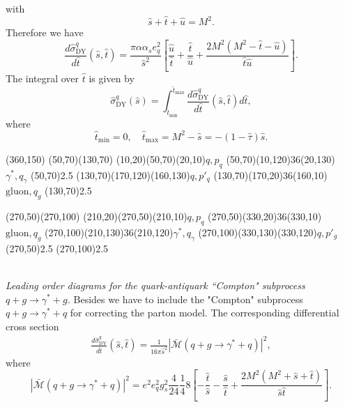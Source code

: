 with 
\begin{equation}
\hat{s}+\hat{t}+\hat{u}=M^2.
\end{equation}
Therefore we have 
\begin{equation}
\frac{d\hat{\sigma}^q_\text{DY}}{d\hat{t}}(\hat{s},\hat{t})=\frac{\pi\alpha\alpha_s e^2_q}{\hat{s}^2}\left[ \frac{\hat{u}}{\hat{t}}+\frac{\hat{t}}{\hat{u}}+\frac{2M^2(M^2-\hat{t}-\hat{u})}{\hat{t}\hat{u}} \right].
\end{equation}
The integral over $\hat{t}$ is given by
\begin{equation}
\hat{\sigma}^q_\text{DY}(\hat{s})=\int_{\hat{t}_\text{min}}^{\hat{t}_\text{max}}\frac{d\hat{\sigma}^q_\text{DY}}{d\hat{t}}(\hat{s},\hat{t})d\hat{t},
\end{equation}
where 
\begin{equation}
\hat{t}_\text{min}=0,\quad \hat{t}_\text{max}=M^2-\hat{s}=-(1-\hat{\tau})\hat{s}.
\end{equation}
\newline\newline
\begin{axopicture}(360,150) 
	\Line[arrow](50,70)(130,70)
	\Line[arrow](10,20)(50,70)\Text(20,10){$q,p_q$}
	\Photon(50,70)(10,120){3}{6}\Text(20,130){$\gamma^\ast,q_\gamma$}
	\Vertex(50,70){2.5}
	\Line[arrow](130,70)(170,120)\Text(160,130){$q,p'_q$}
	\Gluon(130,70)(170,20){3}{6}\Text(160,10){$\text{gluon},q_g$}
	\Vertex(130,70){2.5}
	
	\Line[arrow](270,50)(270,100)
	\Line[arrow](210,20)(270,50)\Text(210,10){$q,p_q$}
	\Gluon(270,50)(330,20){3}{6}\Text(330,10){$\text{gluon},q_g$}
	\Photon(270,100)(210,130){3}{6}\Text(210,120){$\gamma^\ast,q_\gamma$}
	\Line[arrow](270,100)(330,130)\Text(330,120){$q,p'_g$}
	\Vertex(270,50){2.5}
	\Vertex(270,100){2.5}
\end{axopicture}
\\ {\sl Leading order diagrams for the quark-antiquark ``Compton" subprocess $q+g\to\gamma^\ast+g$.}
\newline\newline\newline	
Besides we have to include the "Compton" subprocess $q+g\to\gamma^\ast+q$ for correcting the parton model. The corresponding  differential cross section 
\begin{align}
\frac{d\hat{\sigma}^g_\text{DY}}{d\hat{t}}(\hat{s},\hat{t})=\frac{1}{16\pi\hat{s}^2}\left| \bar{\mathcal{M}}(q+g\to\gamma^\ast+q) \right|^2,
\end{align}
where 
\begin{equation}
\left| \bar{\mathcal{M}}(q+g\to\gamma^\ast+q) \right|^2=e^2e^2_qg^2_s\frac{4}{24}\frac{1}{4}8\left[ -\frac{\hat{t}}{\hat{s}}-\frac{\hat{s}}{\hat{t}}+\frac{2M^2(M^2+\hat{s}+\hat{t})}{\hat{s}\hat{t}} \right].
\end{equation}
